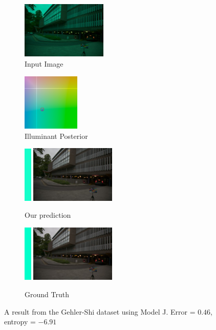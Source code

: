 \documentclass[10pt,twocolumn,letterpaper]{article}
\begin{document}
\begin{figure}[!]
\centering
  \begin{subfigure}[!]{1.7in}
    \includegraphics[width=1.6in]{figures/results/gehlershi/00000515_input.jpg}
    \caption{\footnotesize Input Image}
  \end{subfigure}
  \begin{subfigure}[!]{1.17in}
    \includegraphics[width=1.07in]{figures/results/gehlershi/00000515_chroma.png}
    \caption{\footnotesize Illuminant Posterior}
  \end{subfigure}
\begin{subfigure}[!]{1.9in}
    \includegraphics[width=0.133in]{figures/results/gehlershi/00000515_illum.png}\!
    \includegraphics[width=1.6in]{figures/results/gehlershi/00000515_prediction.jpg}
    \caption{\footnotesize Our prediction}
  \end{subfigure}
  \begin{subfigure}[!]{1.9in}
    \includegraphics[width=0.133in]{figures/results/gehlershi/00000515_illum_true.png}\!
    \includegraphics[width=1.6in]{figures/results/gehlershi/00000515_true.jpg}
    \caption{\footnotesize Ground Truth}
  \end{subfigure}
  \caption{
    A result from the Gehler-Shi dataset using Model J. Error = $0.46$\textdegree, entropy = $-6.91$
    \label{fig:results3}
  }
\end{figure}
\end{document}
